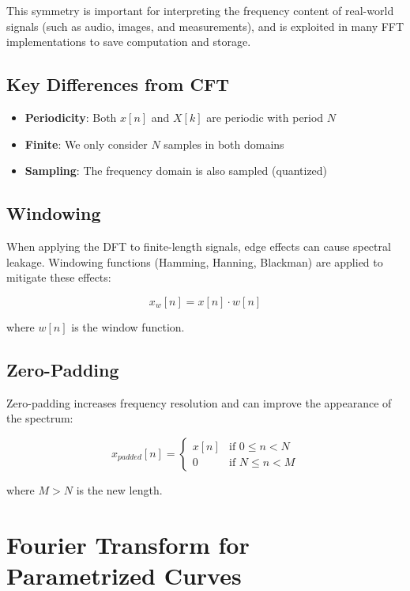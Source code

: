 \documentclass[11pt,a4paper]{article}
\begin{document}
This symmetry is important for interpreting the frequency content of real-world signals (such as audio, images, and measurements), and is exploited in many FFT implementations to save computation and storage.

\subsection{Key Differences from CFT}

\begin{itemize}
    \item \textbf{Periodicity}: Both $x[n]$ and $X[k]$ are periodic with period $N$
    \item \textbf{Finite}: We only consider $N$ samples in both domains
    \item \textbf{Sampling}: The frequency domain is also sampled (quantized)
\end{itemize}

\subsection{Windowing}

When applying the DFT to finite-length signals, edge effects can cause spectral leakage. Windowing functions (Hamming, Hanning, Blackman) are applied to mitigate these effects:

\begin{equation}
x_w[n] = x[n] \cdot w[n]
\end{equation}

where $w[n]$ is the window function.

\subsection{Zero-Padding}

Zero-padding increases frequency resolution and can improve the appearance of the spectrum:

\begin{equation}
x_{padded}[n] = \begin{cases}
x[n] & \text{if } 0 \leq n < N \\
0 & \text{if } N \leq n < M
\end{cases}
\end{equation}

where $M > N$ is the new length.


\section{Fourier Transform for Parametrized Curves}
\end{document}
